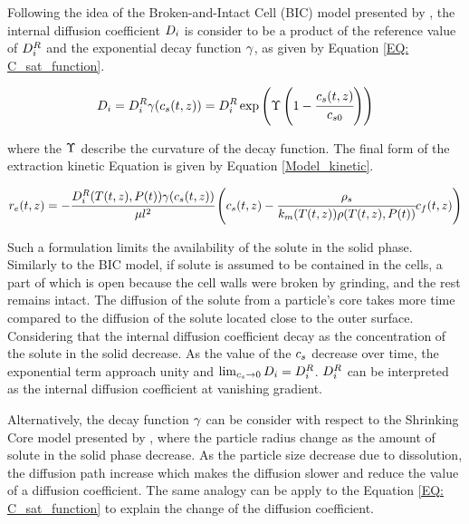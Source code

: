 \documentclass[../Article_Sensitivity_Analsysis.tex]{subfiles}
\begin{document}
	Following the idea of the Broken-and-Intact Cell (BIC) model presented by \citet{Sovova2017}, the internal diffusion coefficient ${\color{black}D_i}$ is consider to be a product of the reference value of ${\color{black}D_i^R}$ and the exponential decay function ${\color{black} \gamma}$, as given by Equation \ref{EQ: C_sat_function}.
		
	{\footnotesize
		\begin{equation}
			{\color{black}D_i} = {\color{black}D_i^R} {\color{black} \gamma}({\color{black} c_s} (t,z)) = {\color{black}D_i^R} \exp\left( {\color{black}\Upsilon} \left( 1-\cfrac{{\color{black} c_s} (t,z) }{{\color{black}c_{s0}}} \right) \right) \label{EQ: C_sat_function}
		\end{equation} }
	
	where the ${\color{black}\Upsilon}$ describe the curvature of the decay function. The final form of the extraction kinetic Equation is given by Equation \ref{Model_kinetic}.
			
	{\scriptsize
		\begin{equation}
			\label{Model_kinetic}
				{\color{black}r_e}(t,z) = -\cfrac{{\color{black}D_i^R}({\color{black}T}(t,z), {\color{black}P}(t)) {\color{black} \gamma}({\color{black} c_s} (t,z)) }{{\color{black} \mu l^2} } \left({\color{black}{\color{black} c_s} }(t,z)  - \cfrac{{\color{black}\rho_s}}{{\color{black}k_m}({\color{black}T}(t,z)){\color{black}\rho}({\color{black}T}(t,z),{\color{black}P}(t))}  {\color{black}c_f}(t,z) \right)
		\end{equation} }
	
	Such a formulation limits the availability of the solute in the solid phase. Similarly to the BIC model, if solute is assumed to be contained in the cells, a part of which is open because the cell walls were broken by grinding, and the rest remains intact. The diffusion of the solute from a particle's core takes more time compared to the diffusion of the solute located close to the outer surface. Considering that the internal diffusion coefficient decay as the concentration of the solute in the solid decrease. As the value of the ${\color{black}c_s}$ decrease over time, the exponential term approach unity and $\lim_{ {\color{black}c_s} \rightarrow 0} {\color{black}D_i} =  {\color{black}D_i^R}$. ${\color{black}D_i^R}$ can be interpreted as the internal diffusion coefficient at vanishing gradient. 
		
	Alternatively, the decay function ${\color{black}\gamma}$ can be consider with respect to the Shrinking Core model presented by \citet{Goto1996}, where the particle radius change as the amount of solute in the solid phase decrease. As the particle size decrease due to dissolution, the diffusion path increase which makes the diffusion slower and reduce the value of a diffusion coefficient. The same analogy can be apply to the Equation \ref{EQ: C_sat_function} to explain the change of the diffusion coefficient.
		
\end{document}
